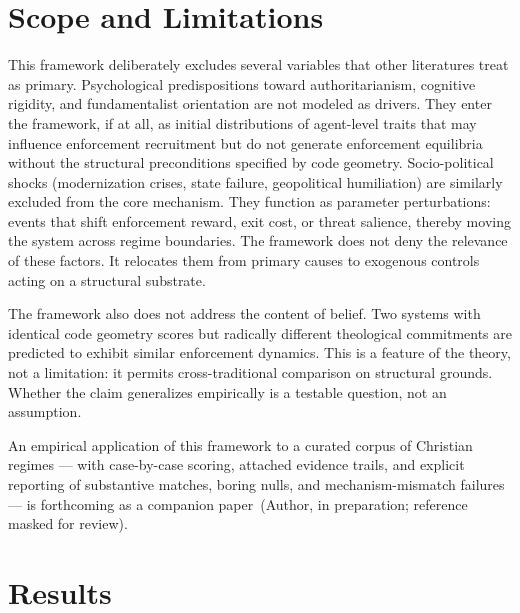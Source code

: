 \documentclass[12pt]{article}
\begin{document}

\section{Scope and Limitations}

This framework deliberately excludes several variables that other literatures treat as primary. Psychological predispositions toward authoritarianism, cognitive rigidity, and fundamentalist orientation are not modeled as drivers. They enter the framework, if at all, as initial distributions of agent-level traits that may influence enforcement recruitment but do not generate enforcement equilibria without the structural preconditions specified by code geometry. Socio-political shocks (modernization crises, state failure, geopolitical humiliation) are similarly excluded from the core mechanism. They function as parameter perturbations: events that shift enforcement reward, exit cost, or threat salience, thereby moving the system across regime boundaries. The framework does not deny the relevance of these factors. It relocates them from primary causes to exogenous controls acting on a structural substrate.

The framework also does not address the content of belief. Two systems with identical code geometry scores but radically different theological commitments are predicted to exhibit similar enforcement dynamics. This is a feature of the theory, not a limitation: it permits cross-traditional comparison on structural grounds. Whether the claim generalizes empirically is a testable question, not an assumption.

An empirical application of this framework to a curated corpus of Christian regimes --- with case-by-case scoring, attached evidence trails, and explicit reporting of substantive matches, boring nulls, and mechanism-mismatch failures --- is forthcoming as a companion paper~(Author, in preparation; reference masked for review).



\section{Results}
\end{document}
